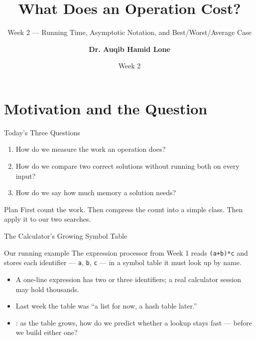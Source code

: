 \documentclass[aspectratio=169]{beamer}
\title{What Does an Operation Cost?}
\subtitle{Week 2 --- Running Time, Asymptotic Notation, and Best/Worst/Average Case}
\author[Dr. Auqib Hamid Lone]{\textbf{Dr. Auqib Hamid Lone}}
\institute[GCET Ganderbal]{PCC CS-301: Data Structures\\GCET, Ganderbal}
\date[Week 2]{\small Week 2}
\begin{document}
\frame{\titlepage}

\section{Motivation and the Question}

\begin{frame}{Today's Three Questions}
  \begin{enumerate}
    \item How do we measure the work an operation does?
    \item How do we compare two correct solutions without running both on every input?
    \item How do we say how much memory a solution needs?
  \end{enumerate}
  \vspace{0.2cm}
  \begin{exampleblock}{Plan}
    First count the work. Then compress the count into a simple class. Then apply it to our two searches.
  \end{exampleblock}
\end{frame}

\begin{frame}{The Calculator's Growing Symbol Table}
  \begin{alertblock}{Our running example}
    The expression processor from Week 1 reads \texttt{(a+b)*c} and stores each
    identifier --- \texttt{a}, \texttt{b}, \texttt{c} --- in a symbol table it
    must look up by name.
  \end{alertblock}
  \begin{itemize}
    \item A one-line expression has two or three identifiers; a real calculator
      session may hold thousands.
    \item Last week the table was ``a list for now, a hash table later.''
    \item {}: as the table grows, how do we predict
      whether a lookup stays fast --- before we build either one?
  \end{itemize}
\end{frame}
\end{document}
